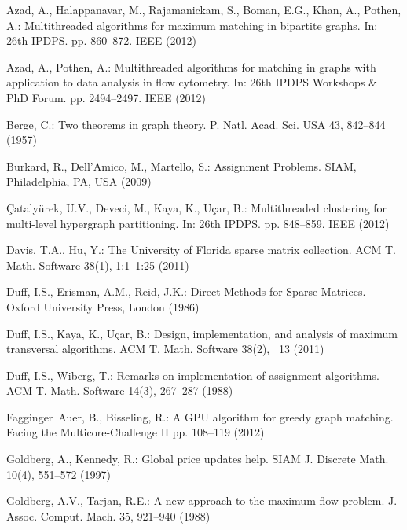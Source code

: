 \documentclass[11pt,a4paper]{article}
\begin{document}
\vspace*{-2ex}

\begin{thebibliography}{10}
\vspace*{-2ex}
\providecommand{\url}[1]{\texttt{#1}}
\providecommand{\urlprefix}{URL }

Azad, A., Halappanavar, M., Rajamanickam, S., Boman, E.G., Khan, A., Pothen,
  A.: Multithreaded algorithms for maximum matching in bipartite graphs. In:
  26th IPDPS. pp. 860--872. IEEE (2012)

Azad, A., Pothen, A.: Multithreaded algorithms for matching in graphs with
  application to data analysis in flow cytometry. In: 26th IPDPS Workshops \&
  PhD Forum. pp. 2494--2497. IEEE (2012)

Berge, C.: Two theorems in graph theory. P. Natl. Acad. Sci. USA  43,  842--844
  (1957)

Burkard, R., Dell'Amico, M., Martello, S.: Assignment Problems. SIAM,
  Philadelphia, PA, USA (2009)

\c{C}ataly\"{u}rek, U.V., Deveci, M., Kaya, K., U\c{c}ar, B.: Multithreaded
  clustering for multi-level hypergraph partitioning. In: 26th IPDPS. pp.
  848--859. IEEE (2012)

Davis, T.A., Hu, Y.: The {U}niversity of {F}lorida sparse matrix collection.
  ACM T. Math. Software  38(1),  1:1--1:25 (2011)

Duff, I.S., Erisman, A.M., Reid, J.K.: Direct Methods for Sparse Matrices.
  Oxford University Press, London (1986)

Duff, I.S., Kaya, K., U{\c{c}}ar, B.: Design, implementation, and analysis of
  maximum transversal algorithms. ACM T. Math. Software  38(2), ~13 (2011)

Duff, I.S., Wiberg, T.: Remarks on implementation of {}
  assignment algorithms. ACM T. Math. Software  14(3),  267--287 (1988)

Fagginger~Auer, B., Bisseling, R.: A {GPU} algorithm for greedy graph matching.
  Facing the Multicore-Challenge II pp. 108--119 (2012)

Goldberg, A., Kennedy, R.: Global price updates help. SIAM J. Discrete Math.
  10(4),  551--572 (1997)

Goldberg, A.V., Tarjan, R.E.: A new approach to the maximum flow problem. J.
  Assoc. Comput. Mach.  35,  921--940 (1988)


\end{thebibliography}
\end{document}
